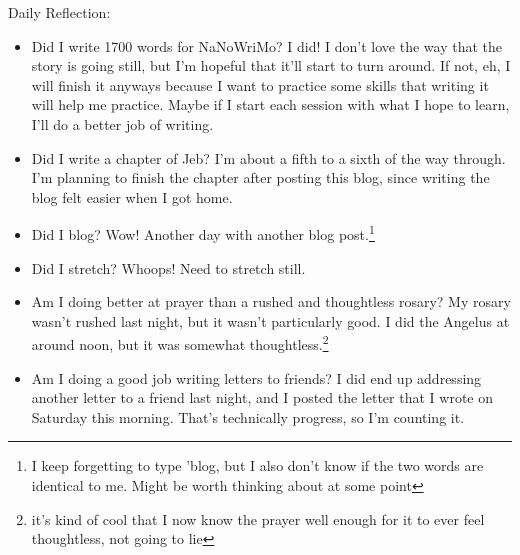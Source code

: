\documentclass[12pt]{article}[titlepage]
\renewcommand{\,}{\textsuperscript{,}}
\begin{document}
Daily Reflection:
\begin{itemize}
\item Did I write 1700 words for NaNoWriMo? I did! I don't love the way that the story is going still, but I'm hopeful that it'll start to turn around.
If not, eh, I will finish it anyways because I want to practice some skills that writing it will help me practice.
Maybe if I start each session with what I hope to learn, I'll do a better job of writing.
\item Did I write a chapter of Jeb? I'm about a fifth to a sixth of the way through.
I'm planning to finish the chapter after posting this blog, since writing the blog felt easier when I got home.
\item Did I blog? Wow! Another day with another blog post.\footnote{I keep forgetting to type 'blog, but I also don't know if the two words are identical to me.
Might be worth thinking about at some point}
\item Did I stretch? Whoops! Need to stretch still.
\item Am I doing better at prayer than a rushed and thoughtless rosary?
My rosary wasn't rushed last night, but it wasn't particularly good.
I did the Angelus at around noon, but it was somewhat thoughtless.\footnote{it's kind of cool that I now know the prayer well enough for it to ever feel thoughtless, not going to lie}
\item Am I doing a good job writing letters to friends? I did end up addressing another letter to a friend last night, and I posted the letter that I wrote on Saturday this morning.
That's technically progress, so I'm counting it.

\end{itemize}
\end{document}
